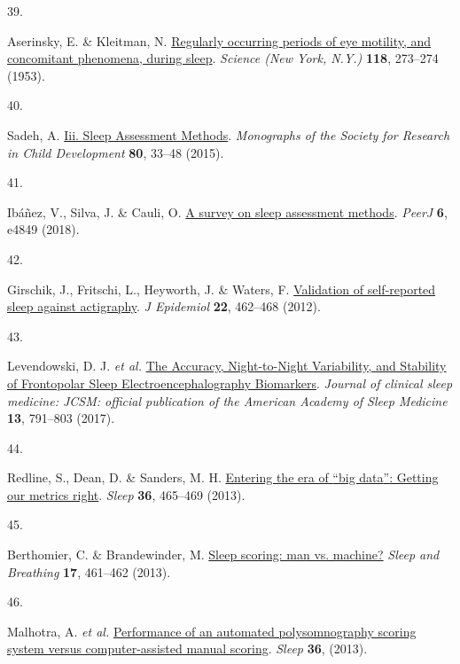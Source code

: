 \documentclass[
  10pt,
]{scrbook}
\newlength{\cslhangindent}
\newlength{\csllabelwidth}
\newlength{\cslentryspacingunit} %
\newenvironment{CSLReferences}[2] %
 {%
  \setlength{\parindent}{0pt}
  \ifodd #1
  \let\oldpar\par
  \def\par{\hangindent=\cslhangindent\oldpar}
  \fi
  \setlength{\parskip}{#2\cslentryspacingunit}
 }%
 {}
\newcommand{\CSLLeftMargin}[1]{\parbox[t]{\csllabelwidth}{#1}}
\newcommand{\CSLRightInline}[1]{\parbox[t]{\linewidth - \csllabelwidth}{#1}\break}
\let\originaltextbf\textbf
\renewcommand{\textbf}[1]{\textcolor{color1}{\textsf{\originaltextbf{#1}}}}
\begin{document}
\begin{CSLReferences}{0}{0}
\leavevmode{}%
\CSLLeftMargin{39. }%
\CSLRightInline{Aserinsky, E. \& Kleitman, N.
\href{https://doi.org/10.1126/science.118.3062.273}{Regularly occurring
periods of eye motility, and concomitant phenomena, during sleep}.
\emph{Science (New York, N.Y.)} \textbf{118}, 273--274 (1953).}

\leavevmode{}%
\CSLLeftMargin{40. }%
\CSLRightInline{Sadeh, A. \href{https://doi.org/10.1111/mono.12143}{Iii.
Sleep Assessment Methods}. \emph{Monographs of the Society for Research
in Child Development} \textbf{80}, 33--48 (2015).}

\leavevmode{}%
\CSLLeftMargin{41. }%
\CSLRightInline{Ibáñez, V., Silva, J. \& Cauli, O.
\href{https://doi.org/10.7717/peerj.4849}{A survey on sleep assessment
methods}. \emph{PeerJ} \textbf{6}, e4849 (2018).}

\leavevmode{}%
\CSLLeftMargin{42. }%
\CSLRightInline{Girschik, J., Fritschi, L., Heyworth, J. \& Waters, F.
\href{https://doi.org/10.2188/jea.je20120012}{Validation of
self-reported sleep against actigraphy}. \emph{J Epidemiol} \textbf{22},
462--468 (2012).}

\leavevmode{}%
\CSLLeftMargin{43. }%
\CSLRightInline{Levendowski, D. J. \emph{et al.}
\href{https://doi.org/10.5664/jcsm.6618}{The Accuracy, Night-to-Night
Variability, and Stability of Frontopolar Sleep Electroencephalography
Biomarkers}. \emph{Journal of clinical sleep medicine: JCSM: official
publication of the American Academy of Sleep Medicine} \textbf{13},
791--803 (2017).}

\leavevmode{}%
\CSLLeftMargin{44. }%
\CSLRightInline{Redline, S., Dean, D. \& Sanders, M. H.
\href{https://doi.org/10.5665/sleep.2524}{Entering the era of {``}big
data{''}: Getting our metrics right}. \emph{Sleep} \textbf{36}, 465--469
(2013).}

\leavevmode{}%
\CSLLeftMargin{45. }%
\CSLRightInline{Berthomier, C. \& Brandewinder, M.
\href{https://doi.org/10.1007/s11325-012-0715-1}{Sleep scoring: man vs.
machine?} \emph{Sleep and Breathing} \textbf{17}, 461--462 (2013).}

\leavevmode{}%
\CSLLeftMargin{46. }%
\CSLRightInline{Malhotra, A. \emph{et al.}
\href{https://doi.org/10.5665/sleep.2548}{Performance of an automated
polysomnography scoring system versus computer-assisted manual scoring}.
\emph{Sleep} \textbf{36}, (2013).}


\end{CSLReferences}
\end{document}
